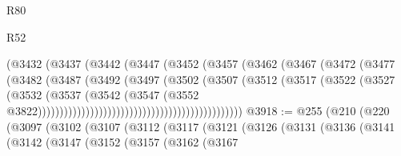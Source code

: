 \begin{lexlean}{R80}
\begin{lexlean}{R52}
\begin{coremodule}
{{{{{{{{{{{{{{{{{{{{{{{{{{{{{{{{{{{{{{{{{{{{{{{{{{{{{{{{{{{{{{{{{{{{{{{{{{{{{{{{{{{{{{{{{{{{{{{{{{{{{{{{{{{{{{{{{{{{{{{{{{{{{{{{{{{{{{{{{{{{{{{{{{{{{{{{{{{{{{{{{{{{{{{{{{{{{{{{{{{{{{{{{{{{{{{{{{{{{{                                                (@3432
                                                  (@3437
                                                    (@3442
                                                      (@3447
                                                        (@3452
                                                          (@3457
                                                            (@3462
                                                              (@3467
                                                                (@3472
                                                                  (@3477
                                                                    (@3482
                                                                      (@3487
                                                                        (@3492
                                                                          (@3497
                                                                            (@3502
                                                                              (@3507
                                                                                (@3512
                                                                                  (@3517
                                                                                    (@3522
                                                                                      (@3527
                                                                                        (@3532
                                                                                          (@3537
                                                                                            (@3542
                                                                                              (@3547
                                                                                                (@3552
                                                                                                  @3822)))))))))))))))))))))))))))))))))))))))))))))))
@3918 := @255
    (@210
      (@220
        (@3097
          (@3102
            (@3107
              (@3112
                (@3117
                  (@3121
                    (@3126
                      (@3131
                        (@3136
                          (@3141
                            (@3142
                              (@3147
                                (@3152
                                  (@3157
                                    (@3162
                                      (@3167
}}}}}}}}}}}}}}}}}}}}}}}}}}}}}}}}}}}}}}}}}}}}}}}}}}}}}}}}}}}}}}}}}}}}}}}}}}}}}}}}}}}}}}}}}}}}}}}}}}}}}}}}}}}}}}}}}}}}}}}}}}}}}}}}}}}}}}}}}}}}}}}}}}}}}}}}}}}}}}}}}}}}}}}}}}}}}}}}}}}}}}}}}}}}}}}}}}}}}}
\end{coremodule}
\end{lexlean}
\end{lexlean}
